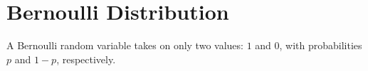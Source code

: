 \section{Bernoulli Distribution}
A Bernoulli random variable takes on only two values: $1$ and $0$, with probabilities $p$ and $1 - p$, respectively.
